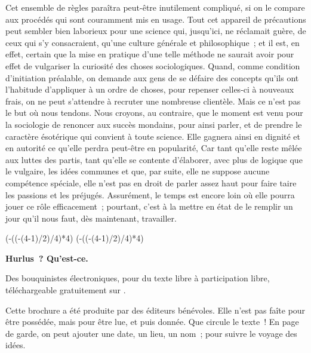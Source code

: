 \documentclass[french,twoside]{book} %
\def\truncdiv#1#2{((#1-(#2-1)/2)/#2)}
\def\moduloop#1#2{(#1-\truncdiv{#1}{#2}*#2)}
\def\modulo#1#2{\number\numexpr\moduloop{#1}{#2}\relax}
\begin{document}
Cet ensemble de règles paraîtra peut-être inutilement compliqué, si on le compare aux procédés qui sont couramment mis en usage. Tout cet appareil de précautions peut sembler bien laborieux pour une science qui, jusqu’ici, ne réclamait guère, de ceux qui s’y consacraient, qu’une culture générale et philosophique ; et il est, en effet, certain que la mise en pratique d’une telle méthode ne saurait avoir pour effet de vulgariser la curiosité des choses sociologiques. Quand, comme condition d’initiation préalable, on demande aux gens de se défaire des concepts qu’ils ont l’habitude d’appliquer à un ordre de choses, pour repenser celles-ci à nouveaux frais, on ne peut s’attendre à recruter une nombreuse clientèle. Mais ce n’est pas le but où nous tendons. Nous croyons, au contraire, que le moment est venu pour la sociologie de renoncer aux succès mondains, pour ainsi parler, et de prendre le caractère ésotérique qui convient à toute science. Elle gagnera ainsi en dignité et en autorité ce qu’elle perdra peut-être en popularité, Car tant qu’elle reste mêlée aux luttes des partis, tant qu’elle se contente d’élaborer, avec plus de logique que le vulgaire, les idées communes et que, par suite, elle ne suppose aucune compétence spéciale, elle n’est pas en droit de parler assez haut pour faire taire les passions et les préjugés. Assurément, le temps est encore loin où elle pourra jouer ce rôle efficacement ; pourtant, c’est à la mettre en état de le remplir un jour qu’il nous faut, dès maintenant, travailler.
 


\ifbooklet
  \pagestyle{empty}
  \clearpage
  \ifnum\modulo{\value{page}}{4}=0 \hbox{}\newpage\hbox{}\newpage\fi
  \ifnum\modulo{\value{page}}{4}=1 \hbox{}\newpage\hbox{}\newpage\fi


  \hbox{}\newpage
  \ifodd\value{page}\hbox{}\newpage\fi
  {\centering\color{rubric}\bfseries\noindent\large
    Hurlus ? Qu’est-ce.\par
    \bigskip
  }
  \noindent Des bouquinistes électroniques, pour du texte libre à participation libre,
  téléchargeable gratuitement sur \href{https://hurlus.fr}{}.\par
  \bigskip
  \noindent Cette brochure a été produite par des éditeurs bénévoles.
  Elle n’est pas faîte pour être possédée, mais pour être lue, et puis donnée.
  Que circule le texte !
  En page de garde, on peut ajouter une date, un lieu, un nom ; pour suivre le voyage des idées.
  \par
\end{document}

